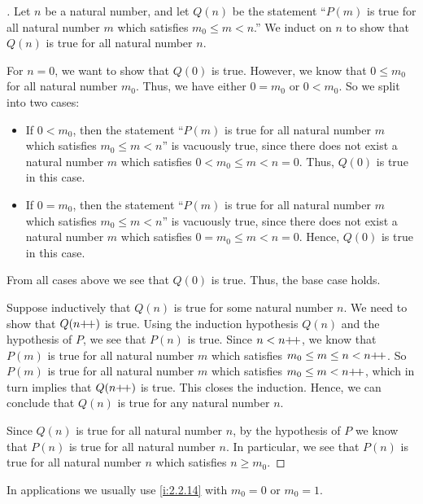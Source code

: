 \begin{proof}[]
  Let \(n\) be a natural number, and let \(Q(n)\) be the statement ``\(P(m)\) is true for all natural number \(m\) which satisfies \(m_0 \leq m < n\).''
  We induct on \(n\) to show that \(Q(n)\) is true for all natural number \(n\).

  For \(n = 0\), we want to show that \(Q(0)\) is true.
  However, we know that \(0 \leq m_0\) for all natural number \(m_0\).
  Thus, we have either \(0 = m_0\) or \(0 < m_0\).
  So we split into two cases:
  \begin{itemize}
    \item If \(0 < m_0\), then the statement ``\(P(m)\) is true for all natural number \(m\) which satisfies \(m_0 \leq m < n\)'' is vacuously true, since there does not exist a natural number \(m\) which satisfies \(0 < m_0 \leq m < n = 0\).
          Thus, \(Q(0)\) is true in this case.
    \item If \(0 = m_0\), then the statement ``\(P(m)\) is true for all natural number \(m\) which satisfies \(m_0 \leq m < n\)'' is vacuously true, since there does not exist a natural number \(m\) which satisfies \(0 = m_0 \leq m < n = 0\).
          Hence, \(Q(0)\) is true in this case.
  \end{itemize}
  From all cases above we see that \(Q(0)\) is true.
  Thus, the base case holds.

  Suppose inductively that \(Q(n)\) is true for some natural number \(n\).
  We need to show that \(Q(n{+}\!{+})\) is true.
  Using the induction hypothesis \(Q(n)\) and the hypothesis of \(P\), we see that \(P(n)\) is true.
  Since \(n < n{+}\!{+}\), we know that \(P(m)\) is true for all natural number \(m\) which satisfies \(m_0 \leq m \leq n < n{+}\!{+}\).
  So \(P(m)\) is true for all natural number \(m\) which satisfies \(m_0 \leq m < n{+}\!{+}\), which in turn implies that \(Q(n{+}\!{+})\) is true.
  This closes the induction.
  Hence, we can conclude that \(Q(n)\) is true for any natural number \(n\).

  Since \(Q(n)\) is true for all natural number \(n\), by the hypothesis of \(P\) we know that \(P(n)\) is true for all natural number \(n\).
  In particular, we see that \(P(n)\) is true for all natural number \(n\) which satisfies \(n \geq m_0\).
\end{proof}

\begin{rmk}\label{i:2.2.15}
  In applications we usually use \cref{i:2.2.14} with \(m_0 = 0\) or \(m_0 = 1\).
\end{rmk}

